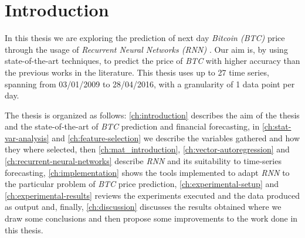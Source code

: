
\chapter{Introduction} %

\label{ch:introduction}

In this thesis we are exploring the prediction of next day
\textit{Bitcoin (BTC)} price through the usage of \textit{Recurrent
Neural Networks (RNN)} . Our aim is, by using state-of-the-art
techniques, to predict the price of \textit{BTC} with higher accuracy than
the previous works in the literature. This thesis uses up to 27 time
series, spanning from 03/01/2009 to 28/04/2016, with a granularity of
1 data point per day.

The thesis is organized as follows: \autoref{ch:introduction}
describes the aim of the thesis and the state-of-the-art of
\textit{BTC} prediction and financial forecasting, in
\autoref{ch:stat-var-analysis} and \autoref{ch:feature-selection} we
describe the variables gathered and how they where selected, then
\autoref{ch:mat_introduction}, \autoref{ch:vector-autoregression} and
\autoref{ch:recurrent-neural-networks} describe \textit{RNN} and its
suitability to time-series forecasting, \autoref{ch:implementation}
shows the tools implemented to adapt \textit{RNN} to the particular
problem of \textit{BTC} price prediction,
\autoref{ch:experimental-setup} and \autoref{ch:experimental-results}
reviews the experiments executed and the data produced as output and,
finally, \autoref{ch:discussion} discusses the results obtained where
we draw some conclusions and then propose some improvements to the
work done in this thesis.


